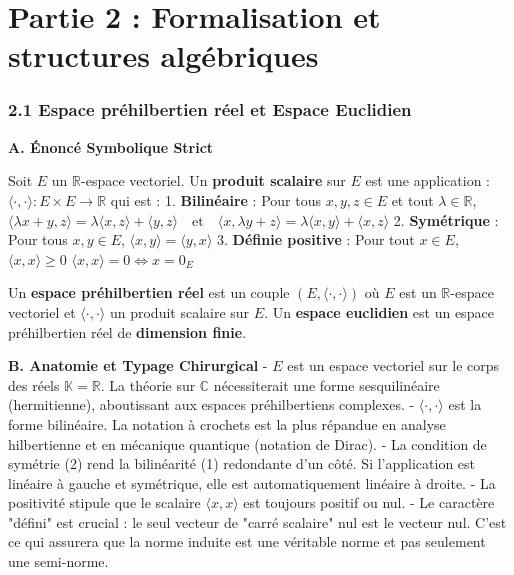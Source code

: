 \documentclass{report}
\begin{document}
\chapter*{Partie 2 : Formalisation et structures algébriques}

\subsection*{2.1 Espace préhilbertien réel et Espace Euclidien}

\textbf{A. Énoncé Symbolique Strict}

Soit $E$ un $\mathbb{R}$-espace vectoriel. Un \textbf{produit scalaire} sur $E$ est une application :
$ \langle \cdot, \cdot \rangle : E \times E \to \mathbb{R} $
qui est :
1. \textbf{Bilinéaire} : Pour tous $x, y, z \in E$ et tout $\lambda \in \mathbb{R}$,
   $ \langle \lambda x + y, z \rangle = \lambda \langle x, z \rangle + \langle y, z \rangle \quad \text{et} \quad \langle x, \lambda y + z \rangle = \lambda \langle x, y \rangle + \langle x, z \rangle $
2. \textbf{Symétrique} : Pour tous $x, y \in E$,
   $ \langle x, y \rangle = \langle y, x \rangle $
3. \textbf{Définie positive} : Pour tout $x \in E$,
   $ \langle x, x \rangle \ge 0 $
   $ \langle x, x \rangle = 0 \iff x = 0_E $

Un \textbf{espace préhilbertien réel} est un couple $(E, \langle \cdot, \cdot \rangle)$ où $E$ est un $\mathbb{R}$-espace vectoriel et $\langle \cdot, \cdot \rangle$ un produit scalaire sur $E$.
Un \textbf{espace euclidien} est un espace préhilbertien réel de \textbf{dimension finie}.

\textbf{B. Anatomie et Typage Chirurgical}
- $E$ est un espace vectoriel sur le corps des réels $\mathbb{K} = \mathbb{R}$. La théorie sur $\mathbb{C}$ nécessiterait une forme sesquilinéaire (hermitienne), aboutissant aux espaces préhilbertiens complexes.
- $\langle \cdot, \cdot \rangle$ est la forme bilinéaire. La notation à crochets est la plus répandue en analyse hilbertienne et en mécanique quantique (notation de Dirac).
- La condition de symétrie (2) rend la bilinéarité (1) redondante d'un côté. Si l'application est linéaire à gauche et symétrique, elle est automatiquement linéaire à droite.
- La positivité stipule que le scalaire $\langle x, x \rangle$ est toujours positif ou nul.
- Le caractère "défini" est crucial : le seul vecteur de "carré scalaire" nul est le vecteur nul. C'est ce qui assurera que la norme induite est une véritable norme et pas seulement une semi-norme.
\end{document}

